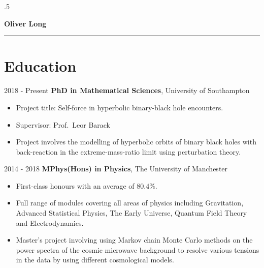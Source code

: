 \documentclass[10.5pt, oneside]{article}   	%
\begin{document}
\moveleft.5\hoffset\centerline{\large\bf Oliver Long} %
 
\noindent\rule{\linewidth}{0.6pt}
 
 \vspace{-3mm}
 
\begin{center}
\huge
\href{mailto:O.F.Long@soton.ac.uk}{} \:
\textcolor{Orcidcolour}{\href{https://orcid.org/0000-0002-3897-9272}{}} \:
\textcolor{RGcolour}{\href{https://www.researchgate.net/profile/Oliver-Long-3}{}} \:
\textcolor{LIcolour}{\href{https://www.linkedin.com/in/oliverflong/}{}} \:
\href{https://scholar.google.com/citations?user=92pSUO0AAAAJ&hl=en}{} \:
\href{https://oliverlong.info}{}
\end{center}

 \vspace{1mm}


\section*{Education}

2018 - Present \quad \textbf{PhD in Mathematical Sciences}, University of Southampton
\begin{itemize}
\item Project title: Self-force in hyperbolic binary-black hole encounters.
\item Supervisor: Prof.\ Leor Barack
\item Project involves the modelling of hyperbolic orbits of binary black holes with back-reaction in the extreme-mass-ratio limit using perturbation theory. 
\end{itemize}

 2014 - 2018 \qquad \textbf{MPhys(Hons) in Physics}, The University of Manchester
\begin{itemize}
\item First-class honours with an average of $80.4\%$.
\item Full range of modules covering all areas of physics including Gravitation, Advanced Statistical Physics, The Early Universe, Quantum Field Theory and Electrodynamics.
\item Master's project involving using Markov chain Monte Carlo methods on the power spectra of the cosmic microwave background to resolve various tensions in the data by using different cosmological models.
\end{itemize} 
\end{document}
